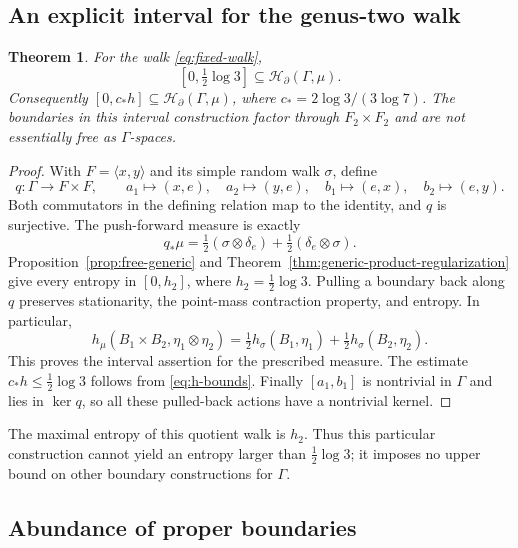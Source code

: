 \documentclass[11pt,letterpaper]{amsart}
\newtheorem{theorem}{Theorem}[section]
\theoremstyle{definition}
\theoremstyle{remark}
\numberwithin{equation}{section}
\newcommand{\HH}{\mathscr H_{\partial}}
\begin{document}
\subsection{An explicit interval for the genus-two walk}\label{sec:product-interval}

\begin{theorem}\label{thm:explicit-product-interval}
For the walk \eqref{eq:fixed-walk},
\[
 [0,\tfrac12\log3]\subseteq\HH(\Gamma,\mu).
\]
Consequently $[0,c_*h]\subseteq\HH(\Gamma,\mu)$, where
$c_*=2\log3/(3\log7)$. The boundaries in this interval construction
factor through $F_2\times F_2$ and are not essentially free as
$\Gamma$-spaces.
\end{theorem}
\begin{proof}
With $F=\langle x,y\rangle$ and its simple random walk $\sigma$, define
\[
 q:\Gamma\longrightarrow F\times F,\qquad
 a_1\mapsto(x,e),\quad a_2\mapsto(y,e),\quad
 b_1\mapsto(e,x),\quad b_2\mapsto(e,y).
\]
Both commutators in the defining relation map to the identity, and
$q$ is surjective. The push-forward measure is exactly
\[
 q_*\mu=\tfrac12(\sigma\otimes\delta_e)
              +\tfrac12(\delta_e\otimes\sigma).
\]
Proposition~\ref{prop:free-generic} and
Theorem~\ref{thm:generic-product-regularization} give every entropy in
$[0,h_2]$, where $h_2=\frac12\log3$. Pulling a boundary back along
$q$ preserves stationarity, the point-mass contraction property, and
entropy. In particular,
\begin{equation}\label{eq:coordinate-product-entropy}
 h_\mu(B_1\times B_2,\eta_1\otimes\eta_2)
 =\tfrac12h_\sigma(B_1,\eta_1)+\tfrac12h_\sigma(B_2,\eta_2).
\end{equation}
This proves the interval assertion for the prescribed measure.
The estimate $c_*h\le\frac12\log3$ follows from \eqref{eq:h-bounds}.
Finally $[a_1,b_1]$ is nontrivial in $\Gamma$ and lies in $\ker q$,
so all these pulled-back actions have a nontrivial kernel.
\end{proof}

The maximal entropy of this quotient walk is $h_2$. Thus this particular
construction cannot yield an entropy larger than $\frac12\log3$;
it imposes no upper bound on other boundary constructions for $\Gamma$.

\subsection{Abundance of proper boundaries}
\end{document}
